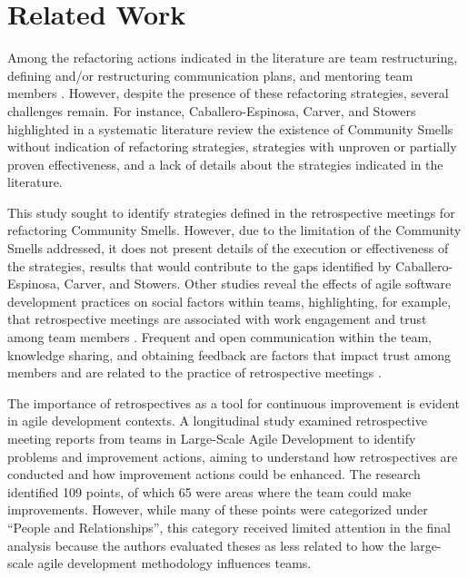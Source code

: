 \section{Related Work}
\label{relatedwork}

Among the refactoring actions indicated in the literature are team restructuring, defining and/or restructuring communication plans, and mentoring team members \cite{catolino2020, sarmento2022, tahsin2022}. However, despite the presence of these refactoring strategies, several challenges remain. For instance, Caballero-Espinosa, Carver, and Stowers~\cite{caballero2023} highlighted in a systematic literature review the existence of Community Smells without indication of refactoring strategies, strategies with unproven or partially proven effectiveness, and a lack of details about the strategies indicated in the literature.

This study sought to identify strategies defined in the retrospective meetings for refactoring Community Smells. However, due to the limitation of the Community Smells addressed, it does not present details of the execution or effectiveness of the strategies, results that would contribute to the gaps identified by Caballero-Espinosa, Carver, and Stowers\cite{caballero2023}.
Other studies reveal the effects of agile software development practices on social factors within teams, highlighting, for example, that retrospective meetings are associated with work engagement and trust among team members \cite{law2005, mchugh2012, muller2021}. Frequent and open communication within the team, knowledge sharing, and obtaining feedback are factors that impact trust among members and are related to the practice of retrospective meetings \cite{mchugh2012}.

The importance of retrospectives as a tool for continuous improvement is evident in agile development contexts. A longitudinal study examined retrospective meeting reports from teams in Large-Scale Agile Development to identify problems and improvement actions, aiming to understand how retrospectives are conducted and how improvement actions could be enhanced\cite{dingsoyr2018}. The research identified 109 points, of which 65 were areas where the team could make improvements. However, while many of these points were categorized under ``People and Relationships'', this category received limited attention in the final analysis because the authors evaluated theses as less related to how the large-scale agile development methodology influences teams.

